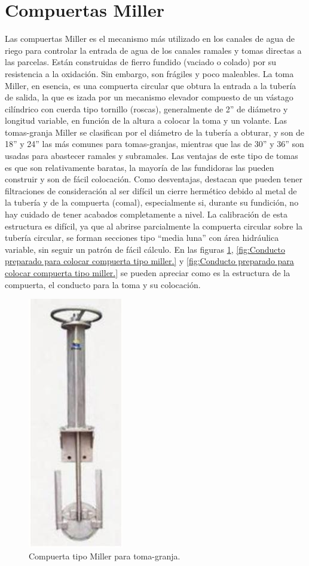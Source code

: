 \section{Compuertas Miller}
\label{sec:Compuertas miller}
Las compuertas Miller es el mecanismo más utilizado en los canales de agua de riego para controlar la entrada de agua de los canales ramales y tomas directas a las parcelas. Están construidas de fierro fundido (vaciado o colado) por su resistencia a la oxidación. Sin embargo, son frágiles y poco maleables. La toma Miller, en esencia, es una compuerta circular que obtura la entrada a la tubería de salida, la que es izada por un mecanismo elevador compuesto de un vástago cilíndrico con cuerda tipo tornillo (roscas), generalmente de 2” de diámetro y longitud variable, en función de la altura a colocar la toma y un volante. Las tomas-granja Miller se clasifican por el diámetro de la tubería a obturar, y son de 18” y 24” las más comunes para tomas-granjas, mientras que las de 30” y 36” son usadas para abastecer ramales y subramales.
Las ventajas de este tipo de tomas es que son relativamente baratas, la mayoría de las fundidoras las pueden construir y son de fácil colocación. Como desventajas, destacan que pueden tener filtraciones de consideración al ser difícil un cierre hermético debido al metal de la tubería y de la compuerta (comal), especialmente si, durante su fundición, no hay cuidado de tener acabados completamente a nivel. La calibración de esta estructura es difícil, ya que al abrirse parcialmente la compuerta circular sobre la tubería circular, se forman secciones tipo “media luna” con área hidráulica variable, sin seguir un patrón de fácil cálculo. 
En las figuras \ref{fig:Compuerta tipo miller para toma-granja}, \ref{fig:Conducto preparado para colocar compuerta tipo miller.} y \ref{fig:Conducto preparado para colocar compuerta tipo miller.} se pueden apreciar como es la estructura de la compuerta, el conducto para la toma y su colocación.

\begin{figure}[h]
\centering
\includegraphics[scale=.65]{./Figures/CompuertaMiller.jpeg}
\caption{Compuerta tipo Miller para toma-granja.}
\label{fig:Compuerta tipo miller para toma-granja}
\end{figure}

